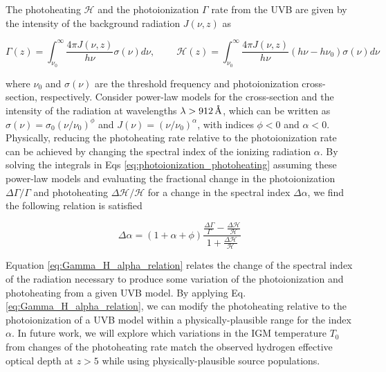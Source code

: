 \documentclass[twocolumn]{aastex62}
\begin{document}
The photoheating $\mathcal{H}$ and the photoionization $\Gamma$ rate from the UVB are given by the intensity  of the background radiation $J(\nu, z)$ as


\begin{equation}
\Gamma(z)=\int_{\nu_{0}}^{\infty} \frac{4 \pi J(\nu, z)}{h \nu} \sigma(\nu) d \nu, \;\;\;\; \;\;\;\;
\mathcal{H}(z) =\int_{\nu_0}^{\infty} \frac{4 \pi J(\nu, z)}{h \nu}\left(h \nu-h \nu_{0}\right) \sigma(\nu) d \nu
\label{eq:photoionization_photoheating}
\end{equation}

\noindent
where $\nu_0$ and $\sigma(\nu) $ are the threshold  frequency and  photoionization cross-section, respectively. 
Consider power-law models for the cross-section and the intensity
of the radiation at wavelengths $\lambda > 912 \, \textup{\AA}$, which
can be written 
as $\sigma(\nu) = \sigma_0 (\nu/\nu_0)^\phi$ and $J(\nu) =  (\nu/\nu_0)^{\alpha}$, with 
indices $\phi<0$ and $\alpha <0$. 
Physically, reducing the photoheating rate relative
to the photoionization rate can be achieved by changing the spectral index  of the ionizing radiation
$\alpha$.  By solving the integrals in Eqs \ref{eq:photoionization_photoheating} assuming
these power-law models
and evaluating the fractional change in the photoionization $\Delta \Gamma / \Gamma$ 
and photoheating $\Delta \mathcal{H} / \mathcal{H}$ for a change in the spectral index $\Delta \alpha$, we find the following relation is satisfied

   
\begin{equation}
\Delta \alpha=(1+\alpha+\phi) \frac{\frac{\Delta \Gamma}{\Gamma}-\frac{\Delta \mathcal{H}}{\mathcal{H}}}{1+\frac{\Delta \mathcal{H}}{\mathcal{H}}}
\label{eq:Gamma_H_alpha_relation}
\end{equation}


\noindent Equation \ref{eq:Gamma_H_alpha_relation} relates the change of the spectral index of the radiation necessary to produce some variation of the photoionization and photoheating 
from a given UVB model. By applying Eq. \ref{eq:Gamma_H_alpha_relation},
we can modify the photoheating relative to
the photoionization of a UVB model within a 
physically-plausible range for the index $\alpha$.
In future work, we will explore which variations in the IGM temperature $T_0$ from changes of the photoheating rate match the
observed hydrogen effective optical depth at $z>5$ while using physically-plausible source
populations. 
\end{document}
